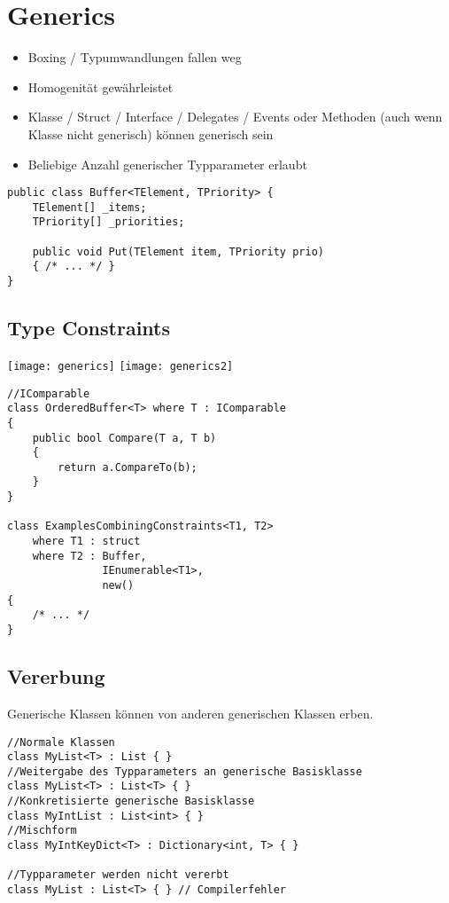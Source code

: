 
\section{Generics}

\begin{multicols*}{2}
\begin{itemize}
    \item Boxing / Typumwandlungen fallen weg
    \item Homogenität gewährleistet
    \item Klasse / Struct / Interface / Delegates / Events oder Methoden (auch wenn Klasse nicht generisch) können generisch sein
    \item Beliebige Anzahl generischer Typparameter erlaubt
\end{itemize}
\begin{lstlisting}
public class Buffer<TElement, TPriority> {
    TElement[] _items;
    TPriority[] _priorities;

    public void Put(TElement item, TPriority prio)
    { /* ... */ }
}
\end{lstlisting}
\subsection{Type Constraints}
\texttt{[image: generics]}
\texttt{[image: generics2]}
\begin{lstlisting}
//IComparable
class OrderedBuffer<T> where T : IComparable
{
    public bool Compare(T a, T b)
    {
        return a.CompareTo(b);
    }
}

class ExamplesCombiningConstraints<T1, T2> 
    where T1 : struct
    where T2 : Buffer,
               IEnumerable<T1>,
               new()
{
    /* ... */
}
\end{lstlisting}
\subsection{Vererbung}
Generische Klassen können von anderen generischen Klassen erben.
\begin{lstlisting}
//Normale Klassen
class MyList<T> : List { }  
//Weitergabe des Typparameters an generische Basisklasse  
class MyList<T> : List<T> { }
//Konkretisierte generische Basisklasse
class MyIntList : List<int> { }
//Mischform
class MyIntKeyDict<T> : Dictionary<int, T> { }

//Typparameter werden nicht vererbt
class MyList : List<T> { } // Compilerfehler
\end{lstlisting}

\end{multicols*}
